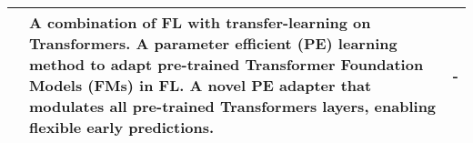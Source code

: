 \begin{changemargin}{-2cm}{0cm}
\begin{tabular}{|c||m{0.4\paperwidth}|m{0.4\paperwidth}|}
        \hline
            \cite{paper:fl_inference_anytime_anywhere}
            &
            A combination of FL with transfer-learning on Transformers.
            A parameter efficient (PE) learning method to adapt pre-trained Transformer Foundation Models (FMs) in FL.
            A novel PE adapter that modulates all pre-trained Transformers layers, enabling flexible early predictions.
            &
            -
        \\
        \hline
    \end{tabular}
    \label{table:fl_research_table_3}
\end{changemargin}